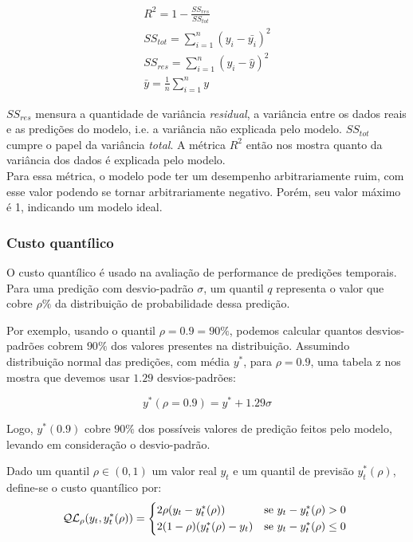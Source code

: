 \begin{align}
&R^2 = 1 - \frac{SS_{res}}{SS_{tot}} &\\
&SS_{tot} = \sum^n_{i=1} (y_i- \bar{y_i})^2 &\\
&SS_{res} = \sum^n_{i=1} (y_i - \hat{y})^2 &\\
&\bar{y} = \frac{1}{n} \sum^n_{i=1} y &
\end{align}

$SS_{res}$ mensura a quantidade de variância \textit{residual}, a
variância entre os dados reais e as predições do modelo, i.e. a variância não
explicada pelo modelo. $SS_{tot}$ cumpre o papel da variância \textit{total}. A métrica $R^2$
então nos mostra quanto da variância dos dados é explicada pelo modelo. \\

Para essa métrica, o modelo pode ter um desempenho arbitrariamente ruim, com esse valor
podendo se tornar arbitrariamente negativo. Porém, seu valor máximo é 1,
indicando um modelo ideal.\\


\subsubsection{Custo quantílico}
\label{sec:quant}
O custo quantílico \citep{deepar} é usado na avaliação de performance de
predições temporais. \\

Para uma predição com desvio-padrão $\sigma$, um quantil $q$ representa o
valor que cobre $\rho\%$ da distribuição de probabilidade dessa predição.

Por exemplo, usando o quantil $\rho=0.9=90\%$, podemos calcular quantos
desvios-padrões cobrem $90\%$ dos valores presentes na distribuição.
Assumindo distribuição normal das predições, com média $y^*$, para $\rho=0.9$, uma tabela z nos mostra que devemos usar $1.29$ desvios-padrões:

\[
  y^*(\rho = 0.9) = y^* + 1.29\sigma
\]

Logo, $y^*(0.9)$ cobre $90\%$ dos possíveis valores de predição feitos pelo
modelo, levando em consideração o desvio-padrão.

Dado um quantil $\rho \in (0,1)$ um valor real $y_{t}$ e um quantil de previsão 
$y^{*}_{t}(\rho)$, define-se o custo quantílico por: \\

\begin{equation}
  \mathcal{QL}_{\rho}(y_{t},y^{*}_{t}(\rho)) =
\begin{cases*}
  2 \rho(y_{t} - y^{*}_{t}(\rho)) & se $ y_{t} - y^{*}_{t}(\rho) > 0$ \\
  2 (1 - \rho)(y^{*}_{t}(\rho) - y_{t}) & se $y_{t} - y^{*}_{t}(\rho) \leq 0$
\end{cases*}
\end{equation}


